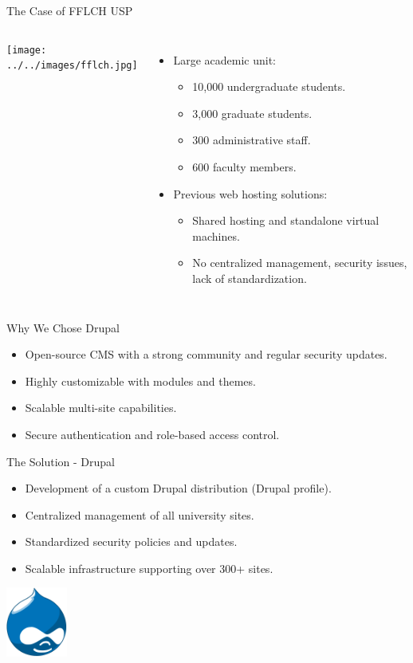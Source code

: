 \begin{frame}{The Case of FFLCH USP}
    \begin{columns}
            \texttt{[image: ../../images/fflch.jpg]}
            \begin{itemize}
                \item Large academic unit:
                \begin{itemize}
                    \item 10,000 undergraduate students.
                    \item 3,000 graduate students.
                    \item 300 administrative staff.
                    \item 600 faculty members.
                \end{itemize}
                \item Previous web hosting solutions:
                \begin{itemize}
                    \item Shared hosting and standalone virtual machines.
                    \item No centralized management, security issues, lack of standardization.
                \end{itemize}
            \end{itemize}
    \end{columns}
\end{frame}

\begin{frame}{Why We Chose Drupal}
    \begin{itemize}
        \item Open-source CMS with a strong community and regular security updates.
        \item Highly customizable with modules and themes.
        \item Scalable multi-site capabilities.
        \item Secure authentication and role-based access control.
    \end{itemize}
\end{frame}

\begin{frame}{The Solution - Drupal}
    \begin{itemize}
        \item Development of a custom Drupal distribution (Drupal profile).
        \item Centralized management of all university sites.
        \item Standardized security policies and updates.
        \item Scalable infrastructure supporting over 300+ sites.
    \end{itemize}
    \includegraphics[width=2cm]{../../images/drupal.png}
\end{frame}


